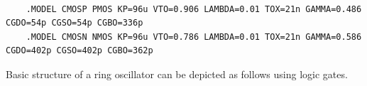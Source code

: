 \documentclass[a4paper,11pt]{article}%
\begin{document}
{\scriptsize
\begin{verbatim}

	.MODEL CMOSP PMOS KP=96u VTO=0.906 LAMBDA=0.01 TOX=21n GAMMA=0.486 CGDO=54p CGSO=54p CGBO=336p
	.MODEL CMOSN NMOS KP=96u VTO=0.786 LAMBDA=0.01 TOX=21n GAMMA=0.586 CGDO=402p CGSO=402p CGBO=362p
\end{verbatim}}

\begin{figure}[H]
	\centering
	\hfill
\end{figure}

\pagebreak
Basic structure of a ring oscillator can be depicted as follows using logic gates.
\end{document}
